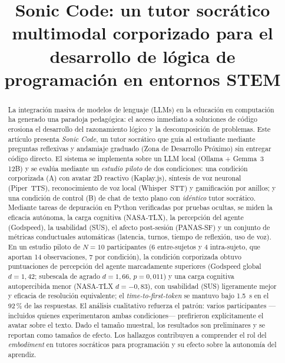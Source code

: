 \documentclass[conference]{IEEEtran}
\begin{document}
\title{Sonic Code: un tutor socr\'atico multimodal corporizado para el desarrollo de l\'ogica de programaci\'on en entornos STEM}

\author{
}

\maketitle

\begin{abstract}
La integraci\'on masiva de modelos de lenguaje (LLMs) en la educaci\'on en computaci\'on
ha generado una paradoja pedag\'ogica: el acceso inmediato a soluciones de c\'odigo erosiona
el desarrollo del razonamiento l\'ogico y la descomposici\'on de problemas. Este art\'iculo
presenta \emph{Sonic Code}, un tutor socr\'atico que gu\'ia al estudiante mediante preguntas
reflexivas y andamiaje graduado (Zona de Desarrollo Pr\'oximo) sin entregar c\'odigo directo.
El sistema se implementa sobre un LLM local (Ollama + Gemma~3 12B) y se eval\'ua mediante un
\emph{estudio piloto} de dos condiciones: una condici\'on corporizada (A) con avatar 2D reactivo
(Kaplay.js), s\'intesis de voz neuronal (Piper~TTS), reconocimiento de voz local (Whisper~STT) y
gamificaci\'on por anillos; y una condici\'on de control (B) de chat de texto plano con
\emph{id\'entico} tutor socr\'atico. Mediante tareas de depuraci\'on en Python verificadas por
pruebas ocultas, se miden la eficacia aut\'onoma, la carga cognitiva (NASA-TLX), la percepci\'on
del agente (Godspeed), la usabilidad (SUS), el afecto post-sesi\'on (PANAS-SF) y un conjunto de
m\'etricas conductuales autom\'aticas (latencia, turnos, tiempo de reflexi\'on, uso de voz).
En un estudio piloto de $N=10$ participantes (6 entre-sujetos y 4 intra-sujeto, que aportan 14
observaciones, 7 por condici\'on), la condici\'on corporizada obtuvo puntuaciones de percepci\'on
del agente marcadamente superiores (Godspeed global $d=1{,}42$; subescala de agrado $d=1{,}66$,
\mbox{$p=0{,}011$}) y una carga cognitiva autopercibida menor (NASA-TLX $d=-0{,}83$), con
usabilidad (SUS) ligeramente mejor y eficacia de resoluci\'on equivalente; el
\emph{time-to-first-token} se mantuvo bajo 1.5~s en el 92\,\% de las respuestas. El an\'alisis
cualitativo refuerza el patr\'on: varios participantes ---incluidos quienes experimentaron ambas
condiciones--- prefirieron expl\'icitamente el avatar sobre el texto. Dado el tama\~no muestral,
los resultados son preliminares y se reportan como tama\~nos de efecto. Los hallazgos contribuyen a
comprender el rol del \emph{embodiment} en tutores socr\'aticos para programaci\'on y su efecto
sobre la autonom\'ia del aprendiz.
\end{abstract}
\end{document}

